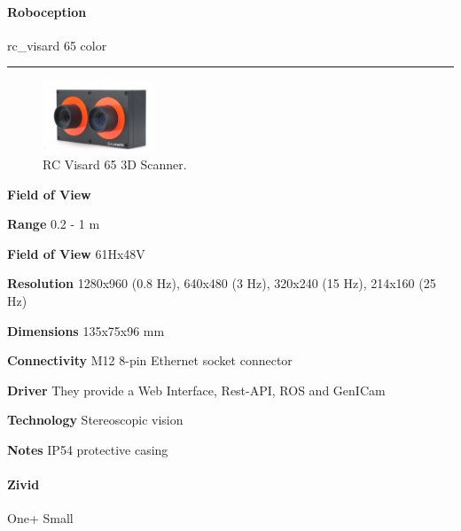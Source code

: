 \documentclass[../main.tex]{subfiles}
\begin{document}
\paragraph{\large \textbf{Roboception}} {\large rc\_visard 65 color}

\noindent\rule{8cm}{0.1pt}
\begin{figure}[H]
    \centering
    \includegraphics[width=0.3\textwidth]{images/rc_visard65.png}
    \caption{RC Visard 65 3D Scanner.}
    \label{fig:rc_visard65}
\end{figure}
\begin{labeling}{\textbf{Field of View    }}
    \setlength{\itemindent}{2em}
    \item [\textbf{Range}] 0.2 - 1 m
    \item [\textbf{Field of View}] 61Hx48V
    \item [\textbf{Resolution}] 1280x960 (0.8 Hz), 640x480 (3 Hz), 320x240 (15 Hz),
    214x160 (25 Hz)
    \item [\textbf{Dimensions}] 135x75x96 mm
    \item [\textbf{Connectivity}] M12 8-pin Ethernet socket connector
    \item [\textbf{Driver}] They provide a Web Interface, Rest-API, ROS and GenICam
    \item [\textbf{Technology}] Stereoscopic vision
    \item [\textbf{Notes}] IP54 protective casing
\end{labeling}
\vspace{1em}
\paragraph{\large \textbf{Zivid}} {\large One+ Small}
\end{document}

